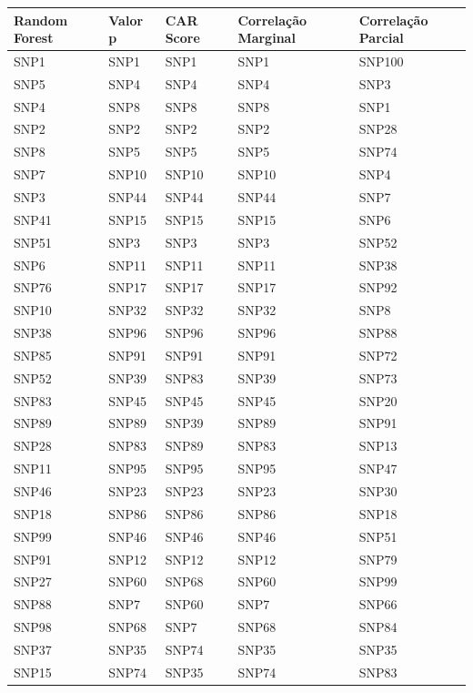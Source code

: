 \begin{table}[ht]
\centering
\begin{tabular}{lllll}
  \hline
Random Forest & Valor p & CAR Score & Correlação Marginal & Correlação Parcial \\ 
  \hline
SNP1 & SNP1 & SNP1 & SNP1 & SNP100 \\ 
  SNP5 & SNP4 & SNP4 & SNP4 & SNP3 \\ 
  SNP4 & SNP8 & SNP8 & SNP8 & SNP1 \\ 
  SNP2 & SNP2 & SNP2 & SNP2 & SNP28 \\ 
  SNP8 & SNP5 & SNP5 & SNP5 & SNP74 \\ 
  SNP7 & SNP10 & SNP10 & SNP10 & SNP4 \\ 
  SNP3 & SNP44 & SNP44 & SNP44 & SNP7 \\ 
  SNP41 & SNP15 & SNP15 & SNP15 & SNP6 \\ 
  SNP51 & SNP3 & SNP3 & SNP3 & SNP52 \\ 
  SNP6 & SNP11 & SNP11 & SNP11 & SNP38 \\ 
  SNP76 & SNP17 & SNP17 & SNP17 & SNP92 \\ 
  SNP10 & SNP32 & SNP32 & SNP32 & SNP8 \\ 
  SNP38 & SNP96 & SNP96 & SNP96 & SNP88 \\ 
  SNP85 & SNP91 & SNP91 & SNP91 & SNP72 \\ 
  SNP52 & SNP39 & SNP83 & SNP39 & SNP73 \\ 
  SNP83 & SNP45 & SNP45 & SNP45 & SNP20 \\ 
  SNP89 & SNP89 & SNP39 & SNP89 & SNP91 \\ 
  SNP28 & SNP83 & SNP89 & SNP83 & SNP13 \\ 
  SNP11 & SNP95 & SNP95 & SNP95 & SNP47 \\ 
  SNP46 & SNP23 & SNP23 & SNP23 & SNP30 \\ 
  SNP18 & SNP86 & SNP86 & SNP86 & SNP18 \\ 
  SNP99 & SNP46 & SNP46 & SNP46 & SNP51 \\ 
  SNP91 & SNP12 & SNP12 & SNP12 & SNP79 \\ 
  SNP27 & SNP60 & SNP68 & SNP60 & SNP99 \\ 
  SNP88 & SNP7 & SNP60 & SNP7 & SNP66 \\ 
  SNP98 & SNP68 & SNP7 & SNP68 & SNP84 \\ 
  SNP37 & SNP35 & SNP74 & SNP35 & SNP35 \\ 
  SNP15 & SNP74 & SNP35 & SNP74 & SNP83 \\ 

\end{tabular}
\end{table}
